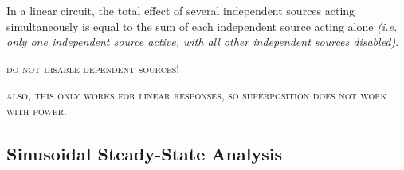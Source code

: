 \begin{multicols}{2}
\begin{CheatsheetEntryFrame}

        In a linear circuit, the total effect of several independent sources acting simultaneously is equal to the sum of each independent source acting alone \textit{(i.e. only one independent source active, with all other independent sources disabled)}.

        \textsc{do not disable dependent sources!}

        \textsc{also, this only works for linear responses, so superposition does not work with power.}

    \end{CheatsheetEntryFrame}



\end{multicols}


\newpage
\subsection{Sinusoidal Steady-State Analysis}%
\label{sub:sinusoidal-steady-state-analysis}

